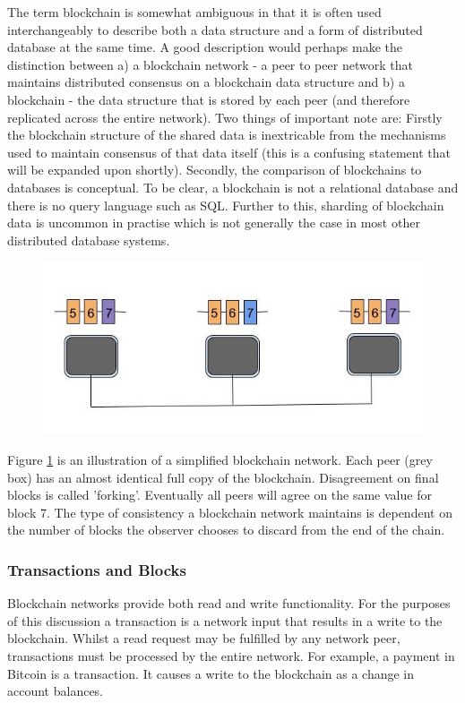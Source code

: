 The term blockchain is somewhat ambiguous in that it is often used interchangeably to describe both a data structure and a form of distributed database at the same time. A good description would perhaps make the distinction between a) a blockchain network - a peer to peer network that maintains distributed consensus on a blockchain data structure and b) a blockchain - the data structure that is stored by each peer (and therefore replicated across the entire network). Two things of important note are: Firstly the blockchain structure of the shared data is inextricable from the mechanisms used to maintain consensus of that data itself (this is a confusing statement that will be expanded upon shortly). Secondly, the comparison of blockchains to databases is conceptual. To be clear, a blockchain is not a relational database and there is no query language such as SQL. Further to this, sharding of blockchain data is uncommon in practise which is not generally the case in most other distributed database systems\cite{Shard}. \\

\begin{figure}
\centering
\includegraphics[width=\textwidth]{Figures/basic_chain}
\decoRule
\caption[]{}
\label{fig:basic_chain}
\end{figure}

Figure \ref{fig:basic_chain} is an illustration of a simplified blockchain network. Each peer (grey box) has an almost identical full copy of the blockchain. Disagreement on final blocks is called 'forking'. Eventually all peers will agree on the same value for block 7. The type of consistency a blockchain network maintains is dependent on the number of blocks the observer chooses to discard from the end of the chain\cite{Bitcoin_consistency}. \\

\subsubsection{Transactions and Blocks}
Blockchain networks provide both read and write functionality. For the purposes of this discussion a transaction is a network input that results in a write to the blockchain. Whilst a read request may be fulfilled by any network peer, transactions must be processed by the entire network. For example, a payment in Bitcoin is a transaction. It causes a write to the blockchain as a change in account balances. \\

